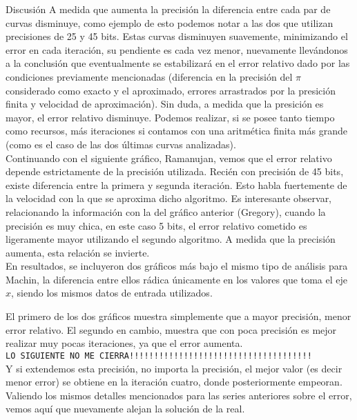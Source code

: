 \begin{section}{Discusión}
	A medida que aumenta la precisión la diferencia entre cada par de curvas disminuye, como ejemplo de esto podemos notar a las dos que utilizan precisiones de 25 y 45 bits. Estas curvas disminuyen suavemente, minimizando el error en cada iteración, su pendiente es cada vez menor, nuevamente llevándonos a la conclusión que eventualmente se estabilizará en el error relativo dado por las condiciones previamente mencionadas (diferencia en la precisión del $\pi$ considerado como exacto y el aproximado, errores arrastrados por la presición finita y velocidad de aproximación). Sin duda, a medida que la presición es mayor, el error relativo disminuye. Podemos realizar, si se posee tanto tiempo como recursos, más iteraciones si contamos con una aritmética finita más grande (como es el caso de las dos últimas curvas analizadas).\\

	
	Continuando con el siguiente gráfico, Ramanujan, vemos que el error relativo depende estrictamente de la precisión utilizada. Recién con precisión de 45 bits, existe diferencia entre la primera y segunda iteración. Esto habla fuertemente de la velocidad con la que se aproxima dicho algoritmo. Es interesante observar, relacionando la información con la del gráfico anterior (Gregory), cuando la precisión es muy chica, en este caso 5 bits, el error relativo cometido es ligeramente mayor utilizando el segundo algoritmo. A medida que la precisión aumenta, esta relación se invierte.\\
	
	En resultados, se incluyeron dos gráficos más bajo el mismo tipo de análisis para Machin, la diferencia entre ellos rádica únicamente en los valores que toma el eje $x$, siendo los mismos datos de entrada utilizados.
	
	El primero de los dos gráficos muestra simplemente que a mayor precisión, menor error relativo. El segundo en cambio, muestra que con poca precisión es mejor realizar muy pocas iteraciones, ya que el error aumenta.\\
	\texttt{LO SIGUIENTE NO ME CIERRA!!!!!!!!!!!!!!!!!!!!!!!!!!!!!!!!!!!!!}\\
	Y si extendemos esta precisión, no importa la precisión, el mejor valor (es decir menor error) se obtiene en la iteración cuatro, donde posteriormente empeoran. Valiendo los mismos detalles mencionados para las series anteriores sobre el error, vemos aquí que nuevamente alejan la solución de la real.\\


\end{section}
